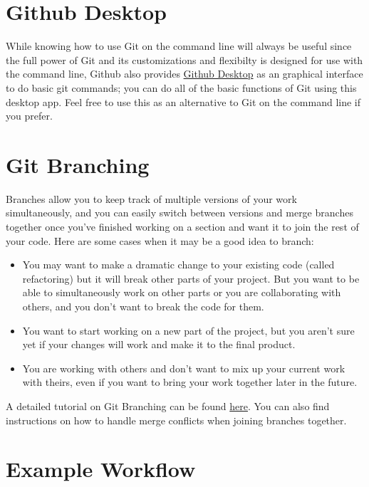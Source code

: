 \documentclass[
]{book}
\providecommand{\tightlist}{%
  \setlength{\itemsep}{0pt}\setlength{\parskip}{0pt}}
\begin{document}
\section{Github Desktop}\label{github-desktop}

While knowing how to use Git on the command line will always be useful since the full power of Git and its customizations and flexibilty is designed for use with the command line, Github also provides \href{https://desktop.github.com/}{Github Desktop} as an graphical interface to do basic git commands; you can do all of the basic functions of Git using this desktop app. Feel free to use this as an alternative to Git on the command line if you prefer.

\section{Git Branching}\label{git-branching}

Branches allow you to keep track of multiple versions of your work simultaneously, and you can easily switch between versions and merge branches together once you've finished working on a section and want it to join the rest of your code. Here are some cases when it may be a good idea to branch:

\begin{itemize}
\tightlist
\item
  You may want to make a dramatic change to your existing code (called refactoring) but it will break other parts of your project. But you want to be able to simultaneously work on other parts or you are collaborating with others, and you don't want to break the code for them.
\item
  You want to start working on a new part of the project, but you aren't sure yet if your changes will work and make it to the final product.
\item
  You are working with others and don't want to mix up your current work with theirs, even if you want to bring your work together later in the future.
\end{itemize}

A detailed tutorial on Git Branching can be found \href{https://sp19.datastructur.es/materials/guides/using-git\#e-git-branching-advanced-git-optional}{here}. You can also find instructions on how to handle merge conflicts when joining branches together.

\section{Example Workflow}\label{example-workflow}
\end{document}
